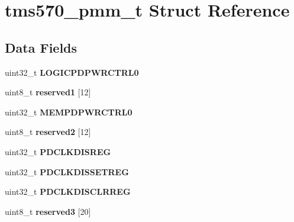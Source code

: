 \hypertarget{structtms570__pmm__t}{}\section{tms570\+\_\+pmm\+\_\+t Struct Reference}
\label{structtms570__pmm__t}
\subsection*{Data Fields}
\begin{DoxyCompactItemize}
\item 
\mbox{\label{structtms570__pmm__t_a37e32ae3491cde81ff1be9eff725f6ee}} 
uint32\+\_\+t {\bfseries L\+O\+G\+I\+C\+P\+D\+P\+W\+R\+C\+T\+R\+L0}
\item 
\mbox{\label{structtms570__pmm__t_adb2cf785000498de094007d13f730a7b}} 
uint8\+\_\+t {\bfseries reserved1} \mbox{[}12\mbox{]}
\item 
\mbox{\label{structtms570__pmm__t_a39b2b765c8b303076933f376f4302cc4}} 
uint32\+\_\+t {\bfseries M\+E\+M\+P\+D\+P\+W\+R\+C\+T\+R\+L0}
\item 
\mbox{\label{structtms570__pmm__t_aa37d49296c570cfb7ba817a2e7613b96}} 
uint8\+\_\+t {\bfseries reserved2} \mbox{[}12\mbox{]}
\item 
\mbox{\label{structtms570__pmm__t_af32f3f30f8280e5a7f74a6cbeb12208d}} 
uint32\+\_\+t {\bfseries P\+D\+C\+L\+K\+D\+I\+S\+R\+EG}
\item 
\mbox{\label{structtms570__pmm__t_ade1e71371071597a74330a37bca76fd7}} 
uint32\+\_\+t {\bfseries P\+D\+C\+L\+K\+D\+I\+S\+S\+E\+T\+R\+EG}
\item 
\mbox{\label{structtms570__pmm__t_a52bb4c1c8e1816842f8cc05021acbb78}} 
uint32\+\_\+t {\bfseries P\+D\+C\+L\+K\+D\+I\+S\+C\+L\+R\+R\+EG}
\item 
\mbox{\label{structtms570__pmm__t_a0785ef778c20113aa64f635876da49af}} 
uint8\+\_\+t {\bfseries reserved3} \mbox{[}20\mbox{]}
\item 
\mbox{\label{structtms570__pmm__t_ad1e99d24f9ba5e58c3c7a2f427ad54d9}} 

\end{DoxyCompactItemize}
